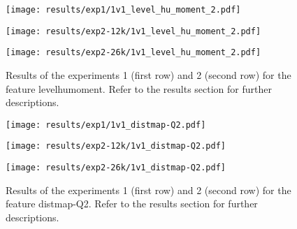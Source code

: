 
 
\begin{figure}[h!]
    \centering
	\begin{minipage}{0.3\linewidth}
		\texttt{[image: results/exp1/1v1\_level\_hu\_moment\_2.pdf]}
	\end{minipage}

	\begin{minipage}{0.3\linewidth}
		\texttt{[image: results/exp2-12k/1v1\_level\_hu\_moment\_2.pdf]}
	\end{minipage}
	\begin{minipage}{0.3\linewidth}
		\texttt{[image: results/exp2-26k/1v1\_level\_hu\_moment\_2.pdf]}
	\end{minipage}

	\caption[ Results: Feature level\textunderscore hu\textunderscore moment]{ Results of the experiments 1 (first row) and 2 (second row) for the feature level\textunderscore hu\textunderscore moment. Refer to the results section for further descriptions. }
	\label{fig:appendix_level_hu_moment_2}
\end{figure}
 
\begin{figure}[h!]
    \centering
	\begin{minipage}{0.3\linewidth}
		\texttt{[image: results/exp1/1v1\_distmap-Q2.pdf]}
	\end{minipage}

	\begin{minipage}{0.3\linewidth}
		\texttt{[image: results/exp2-12k/1v1\_distmap-Q2.pdf]}
	\end{minipage}
	\begin{minipage}{0.3\linewidth}
		\texttt{[image: results/exp2-26k/1v1\_distmap-Q2.pdf]}
	\end{minipage}

	\caption[ Results: Feature distmap-Q2]{ Results of the experiments 1 (first row) and 2 (second row) for the feature distmap-Q2. Refer to the results section for further descriptions. }
	\label{fig:appendix_distmap-Q2}
\end{figure}
 \newpage 

